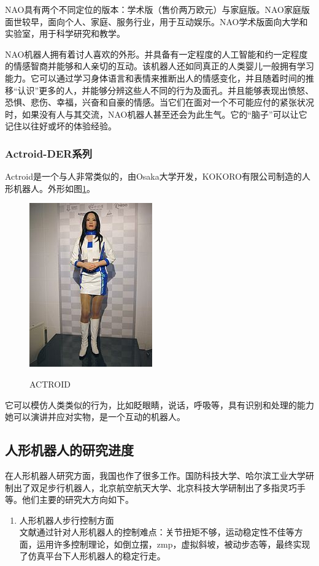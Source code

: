 \documentclass[10pt,a4paper]{article}
\begin{document}
\begin{CJK*}{UTF8}{gkai}
NAO具有两个不同定位的版本：学术版（售价两万欧元）与家庭版。NAO家庭版面世较早，面向个人、家庭、服务行业，用于互动娱乐。NAO学术版面向大学和实验室，用于科学研究和教学。

NAO机器人拥有着讨人喜欢的外形。并具备有一定程度的人工智能和约一定程度的情感智商并能够和人亲切的互动。该机器人还如同真正的人类婴儿一般拥有学习能力。它可以通过学习身体语言和表情来推断出人的情感变化，并且随着时间的推移“认识”更多的人，并能够分辨这些人不同的行为及面孔。并且能够表现出愤怒、恐惧、悲伤、幸福，兴奋和自豪的情感。当它们在面对一个不可能应付的紧张状况时，如果没有人与其交流，NAO机器人甚至还会为此生气。它的“脑子”可以让它记住以往好或坏的体验经验。

\subsubsection{Actroid-DER系列}
Actroid是一个与人非常类似的，由Osaka大学开发，KOKORO有限公司制造的人形机器人。外形如图\ref{fig:actroid}。\\
\begin{figure}[!htbp]
	\centering
	\caption{ACTROID}  
		\includegraphics[scale=0.35]{figs/Actroid.jpg}
    	\label{fig:actroid}
\end{figure}


它可以模仿人类类似的行为，比如眨眼睛，说话，呼吸等，具有识别和处理的能力她可以演讲并应对实物，是一个互动的机器人。


\subsection{人形机器人的研究进度}
在人形机器人研究方面，我国也作了很多工作。国防科技大学、哈尔滨工业大学研制出了双足步行机器人，北京航空航天大学、北京科技大学研制出了多指灵巧手等。他们主要的研究大方向如下。
\begin{enumerate}
\item 人形机器人步行控制方面\\
文献\cite{3}通过针对人形机器人的控制难点：关节扭矩不够，运动稳定性不佳等方面，运用许多控制理论，如倒立摆，zmp，虚拟斜坡，被动步态等，最终实现了仿真平台下人形机器人的稳定行走。



\end{enumerate}
\end{CJK*}
\end{document}
